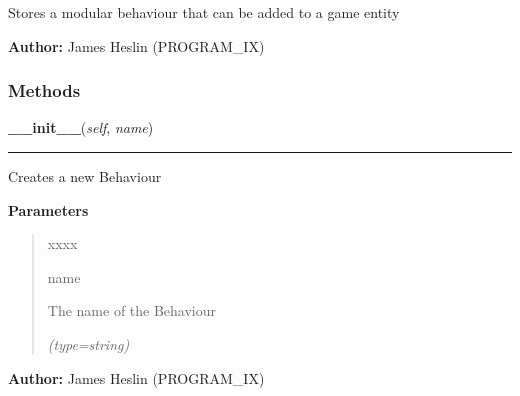     \label{pystroke:behaviour:Behaviour}
Stores a modular behaviour that can be added to a game entity

\textbf{Author:} James Heslin (PROGRAM\_IX)





  \subsubsection{Methods}

    \label{pystroke:behaviour:Behaviour:__init__}

    \vspace{0.5ex}

\hspace{.8\funcindent}\begin{boxedminipage}{\funcwidth}

    \raggedright \textbf{\_\_init\_\_}(\textit{self}, \textit{name})

    \vspace{-1.5ex}

    \rule{\textwidth}{0.5\fboxrule}
\setlength{\parskip}{2ex}
    Creates a new Behaviour

\setlength{\parskip}{1ex}
      \textbf{Parameters}
      \vspace{-1ex}

      \begin{quote}
        \begin{Ventry}{xxxx}

          \item[name]

          The name of the Behaviour

            {\it (type=string)}

        \end{Ventry}

      \end{quote}

\textbf{Author:} James Heslin (PROGRAM\_IX)



    \end{boxedminipage}

